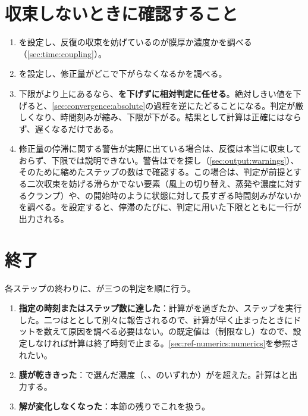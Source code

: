 \section{収束しないときに確認すること}
\label{sec:convergence:diagnosis}

\begin{enumerate}
  \item {}を設定し、反復の収束を妨げているのが膜厚か濃度かを調べる（\cref{sec:time:coupling}）。
  \item {}を設定し、修正量がどこで下がらなくなるかを調べる。
  \item 下限がより上にあるなら、\textbf{を下げずに相対判定に任せる}。絶対しきい値を下げると、\cref{sec:convergence:absolute}の過程を逆にたどることになる。判定が厳しくなり、時間刻みが縮み、下限が下がる。結果として計算は正確にはならず、遅くなるだけである。
  \item 修正量の停滞に関する警告が実際に出ている場合は、反復は本当に収束しておらず、下限では説明できない。警告はでを探し（\cref{sec:output:warnings}）、そのために縮めたステップの数はで確認する。この場合は、判定が前提とする二次収束を妨げる滑らかでない要素（風上の切り替え、蒸発や濃度に対するクランプ）や、の開始時のように状態に対して長すぎる時間刻みがないかを調べる。を設定すると、停滞のたびに、判定に用いた下限とともに一行が出力される。
\end{enumerate}

\section{終了}
\label{sec:convergence:termination}

各ステップの終わりに、が三つの判定を順に行う。

\begin{enumerate}
  \item \textbf{指定の時刻またはステップ数に達した}：計算がを過ぎたか、ステップを実行した。二つはととして別々に報告されるので、計算が早く止まったときにドットを数えて原因を調べる必要はない。の既定値は（制限なし）なので、設定しなければ計算は終了時刻で止まる。\cref{sec:ref-numerics:numerics}を参照されたい。
  \item \textbf{膜が乾ききった}：で選んだ濃度（、、のいずれか）がを超えた。計算はと出力する。
  \item \textbf{解が変化しなくなった}：本節の残りでこれを扱う。
\end{enumerate}

